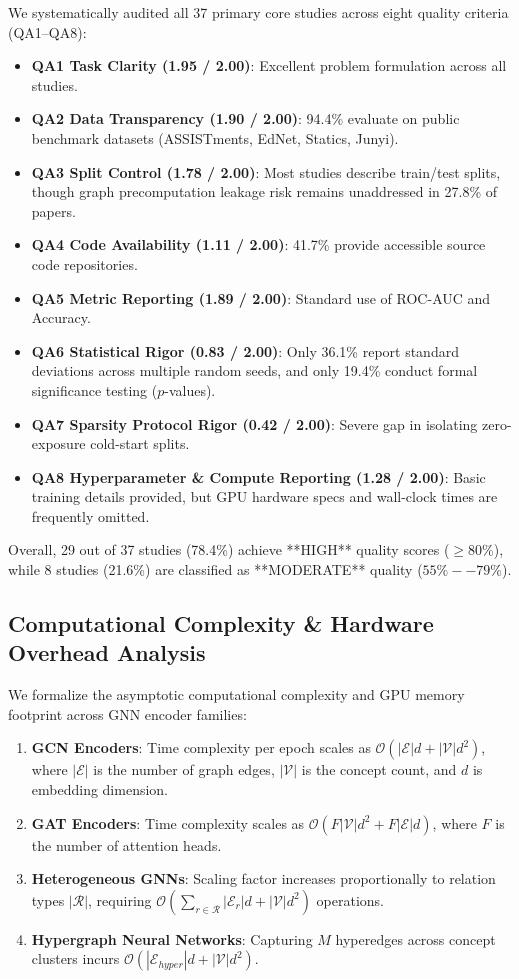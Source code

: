 \documentclass[journal]{IEEEtran}
\begin{document}
We systematically audited all 37 primary core studies across eight quality criteria (QA1--QA8):
\begin{itemize}
    \item \textbf{QA1 Task Clarity (1.95 / 2.00)}: Excellent problem formulation across all studies.
    \item \textbf{QA2 Data Transparency (1.90 / 2.00)}: 94.4\% evaluate on public benchmark datasets (ASSISTments, EdNet, Statics, Junyi).
    \item \textbf{QA3 Split Control (1.78 / 2.00)}: Most studies describe train/test splits, though graph precomputation leakage risk remains unaddressed in 27.8\% of papers.
    \item \textbf{QA4 Code Availability (1.11 / 2.00)}: 41.7\% provide accessible source code repositories.
    \item \textbf{QA5 Metric Reporting (1.89 / 2.00)}: Standard use of ROC-AUC and Accuracy.
    \item \textbf{QA6 Statistical Rigor (0.83 / 2.00)}: Only 36.1\% report standard deviations across multiple random seeds, and only 19.4\% conduct formal significance testing ($p$-values).
    \item \textbf{QA7 Sparsity Protocol Rigor (0.42 / 2.00)}: Severe gap in isolating zero-exposure cold-start splits.
    \item \textbf{QA8 Hyperparameter \& Compute Reporting (1.28 / 2.00)}: Basic training details provided, but GPU hardware specs and wall-clock times are frequently omitted.
\end{itemize}

Overall, 29 out of 37 studies (78.4\%) achieve **HIGH** quality scores ($\ge 80\%$), while 8 studies (21.6\%) are classified as **MODERATE** quality ($55\%--79\%$).

\subsection{Computational Complexity \& Hardware Overhead Analysis}
We formalize the asymptotic computational complexity and GPU memory footprint across GNN encoder families:
\begin{enumerate}
    \item \textbf{GCN Encoders}: Time complexity per epoch scales as $\mathcal{O}(|\mathcal{E}| d + |\mathcal{V}| d^2)$, where $|\mathcal{E}|$ is the number of graph edges, $|\mathcal{V}|$ is the concept count, and $d$ is embedding dimension.
    \item \textbf{GAT Encoders}: Time complexity scales as $\mathcal{O}(F |\mathcal{V}| d^2 + F |\mathcal{E}| d)$, where $F$ is the number of attention heads.
    \item \textbf{Heterogeneous GNNs}: Scaling factor increases proportionally to relation types $|\mathcal{R}|$, requiring $\mathcal{O}(\sum_{r \in \mathcal{R}} |\mathcal{E}_r| d + |\mathcal{V}| d^2)$ operations.
    \item \textbf{Hypergraph Neural Networks}: Capturing $M$ hyperedges across concept clusters incurs $\mathcal{O}(|\mathcal{E}_{hyper}| d + |\mathcal{V}| d^2)$.
\end{enumerate}
\end{document}
